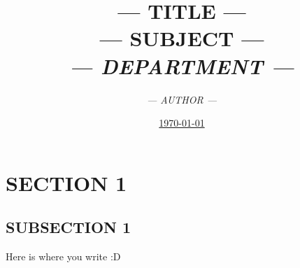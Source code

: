 \documentclass[12pt,a4paper, spanish]{article}
\title{\textbf{--- TITLE ---} \\
       \textsc{--- SUBJECT ---} \\
       \emph{--- DEPARTMENT ---}}
\author{\emph{--- AUTHOR ---}}
\date{\underline{\today}}
\begin{document}
\maketitle
\thispagestyle{empty}
\renewcommand*\contentsname{Index of contents}
\tableofcontents
\pagebreak


\section{SECTION 1}
\subsection{SUBSECTION 1}


Here is where you write :D
\end{document}
